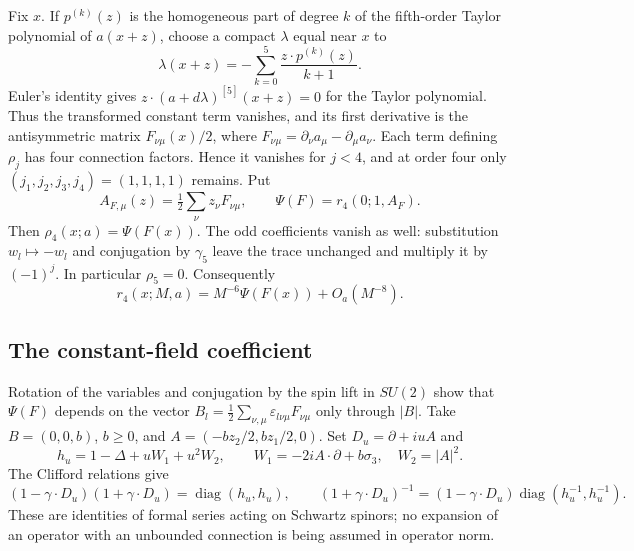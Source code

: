 \documentclass[11pt,letterpaper,reqno]{amsart}
\DeclareMathOperator{\diag}{diag}
\begin{document}
Fix $x$. If $p^{(k)}(z)$ is the homogeneous part of degree $k$ of
the fifth-order Taylor polynomial of $a(x+z)$, choose a compact
$\lambda$ equal near $x$ to
\[
 \lambda(x+z)=-\sum_{k=0}^5\frac{z\cdot p^{(k)}(z)}{k+1}.
\]
Euler's identity gives $z\cdot(a+d\lambda)^{[5]}(x+z)=0$ for
the Taylor polynomial. Thus the transformed constant term vanishes,
and its first derivative is the antisymmetric matrix
$F_{\nu\mu}(x)/2$, where
$F_{\nu\mu}=\partial_\nu a_\mu-\partial_\mu a_\nu$.
Each term defining $\rho_j$ has four connection factors. Hence it
vanishes for $j<4$, and at order four only $(j_1,j_2,j_3,j_4)=(1,1,1,1)$
remains. Put
\[
 A_{F,\mu}(z)=\tfrac12\sum_\nu z_\nu F_{\nu\mu},\qquad
 \Psi(F)=r_4(0;1,A_F).
\]
Then $\rho_4(x;a)=\Psi(F(x))$. The odd coefficients vanish as well:
substitution $w_l\mapsto-w_l$ and conjugation by $\gamma_5$ leave
the trace unchanged and multiply it by $(-1)^j$. In particular
$\rho_5=0$. Consequently
\begin{equation}\label{eq:probe-field-strength-reduction}
 r_4(x;M,a)=M^{-6}\Psi(F(x))+O_a(M^{-8}).
\end{equation}

\subsection{The constant-field coefficient}

Rotation of the variables and conjugation by the spin lift in $SU(2)$
show that $\Psi(F)$ depends on the vector
$B_l=\tfrac12\sum_{\nu,\mu}\varepsilon_{l\nu\mu}F_{\nu\mu}$ only
through $|B|$. Take $B=(0,0,b)$, $b\ge0$, and
$A=(-bz_2/2,bz_1/2,0)$. Set $D_u=\partial+iuA$ and
\[
 h_u=1-\Delta+uW_1+u^2W_2,\qquad
 W_1=-2iA\cdot\partial+b\sigma_3,\quad
 W_2=|A|^2.
\]
The Clifford relations give
\begin{equation}\label{eq:probe-squared-dirac}
 (1-\gamma\cdot D_u)(1+\gamma\cdot D_u)
   =\diag(h_u,h_u),\qquad
 (1+\gamma\cdot D_u)^{-1}
   =(1-\gamma\cdot D_u)\diag(h_u^{-1},h_u^{-1}).
\end{equation}
These are identities of formal series acting on Schwartz spinors;
no expansion of an operator with an unbounded connection is being
assumed in operator norm.
\end{document}
